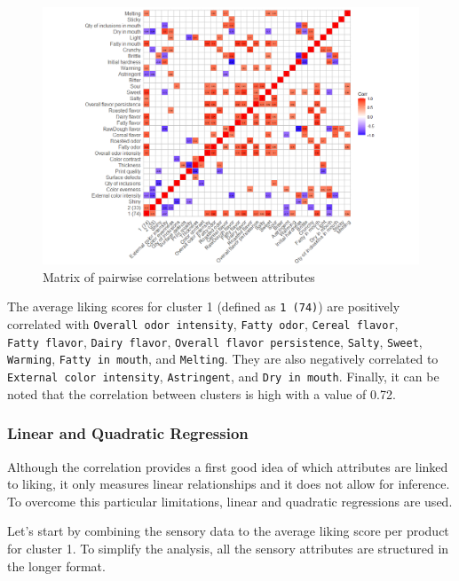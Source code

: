 \documentclass[
]{krantz}
\begin{document}
\begin{figure}
\includegraphics[width=16.36in]{images/Correl_matrix} \caption{Matrix of pairwise correlations between attributes}\label{fig:unnamed-chunk-299}
\end{figure}

The average liking scores for cluster 1 (defined as \texttt{1\ (74)}) are positively correlated with \texttt{Overall\ odor\ intensity}, \texttt{Fatty\ odor}, \texttt{Cereal\ flavor}, \texttt{Fatty\ flavor}, \texttt{Dairy\ flavor}, \texttt{Overall\ flavor\ persistence}, \texttt{Salty}, \texttt{Sweet}, \texttt{Warming}, \texttt{Fatty\ in\ mouth}, and \texttt{Melting}. They are also negatively correlated to \texttt{External\ color\ intensity}, \texttt{Astringent}, and \texttt{Dry\ in\ mouth}.
Finally, it can be noted that the correlation between clusters is high with a value of 0.72.

\hypertarget{linear-and-quadratic-regression}{%
\subsubsection{Linear and Quadratic Regression}\label{linear-and-quadratic-regression}}

Although the correlation provides a first good idea of which attributes are linked to liking, it only measures linear relationships and it does not allow for inference. To overcome this particular limitations, linear and quadratic regressions are used.

Let's start by combining the sensory data to the average liking score per product for cluster 1. To simplify the analysis, all the sensory attributes are structured in the longer format.
\end{document}
